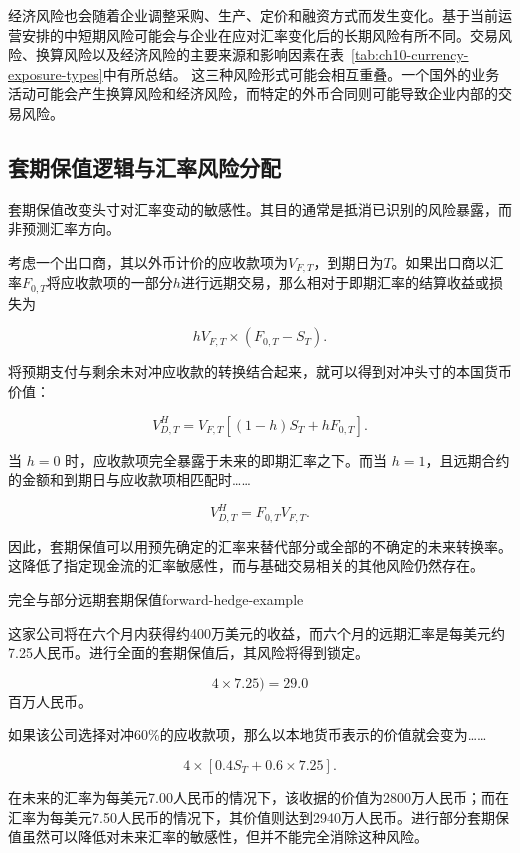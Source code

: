 经济风险也会随着企业调整采购、生产、定价和融资方式而发生变化。基于当前运营安排的中短期风险可能会与企业在应对汇率变化后的长期风险有所不同。交易风险、换算风险以及经济风险的主要来源和影响因素在表~\ref{tab:ch10-currency-exposure-types}中有所总结。
这三种风险形式可能会相互重叠。一个国外的业务活动可能会产生换算风险和经济风险，而特定的外币合同则可能导致企业内部的交易风险。


\subsection{套期保值逻辑与汇率风险分配}

套期保值改变头寸对汇率变动的敏感性。其目的通常是抵消已识别的风险暴露，而非预测汇率方向。

考虑一个出口商，其以外币计价的应收款项为$V_{F,T}$，到期日为$T$。如果出口商以汇率$F_{0,T}$将应收款项的一部分$h$进行远期交易，那么相对于即期汇率的结算收益或损失为

\begin{equation}
hV_{F,T}\times(F_{0,T}-S_T).
\label{eq:ch10-export-forward-payoff}
\end{equation}

将预期支付与剩余未对冲应收款的转换结合起来，就可以得到对冲头寸的本国货币价值：

\begin{equation}
V_{D,T}^{H}
=
V_{F,T}\left[(1-h)S_T+hF_{0,T}\right].
\label{eq:ch10-partial-forward-hedge}
\end{equation}

当 $h=0$ 时，应收款项完全暴露于未来的即期汇率之下。而当 $h=1$，且远期合约的金额和到期日与应收款项相匹配时……

\begin{equation}
V_{D,T}^{H}=F_{0,T}V_{F,T}.
\label{eq:ch10-full-forward-hedge}
\end{equation}

因此，套期保值可以用预先确定的汇率来替代部分或全部的不确定的未来转换率。这降低了指定现金流的汇率敏感性，而与基础交易相关的其他风险仍然存在。

\begin{example}{完全与部分远期套期保值}{forward-hedge-example}

这家公司将在六个月内获得约400万美元的收益，而六个月的远期汇率是每美元约7.25人民币。进行全面的套期保值后，其风险将得到锁定。

$$
4\times 7.25)=29.0
$$
百万人民币。

如果该公司选择对冲60\%的应收款项，那么以本地货币表示的价值就会变为……

$$
4\times\left[0.4S_T+0.6\times 7.25\right].
$$

在未来的汇率为每美元7.00人民币的情况下，该收据的价值为2800万人民币；而在汇率为每美元7.50人民币的情况下，其价值则达到2940万人民币。进行部分套期保值虽然可以降低对未来汇率的敏感性，但并不能完全消除这种风险。

\end{example}

